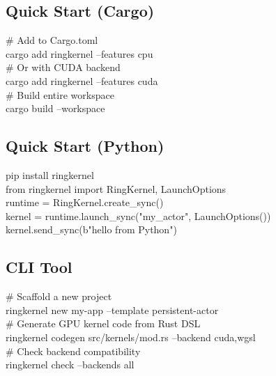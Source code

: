 \documentclass[11pt,a4paper]{article}
\begin{document}
\subsection{Quick Start (Cargo)}

\begin{tcolorbox}[colback=brand!3, colframe=brand!40, boxrule=0.5pt, arc=3pt,
                   left=8pt, right=8pt, top=6pt, bottom=6pt]
\ttfamily\small
\# Add to Cargo.toml\\
cargo add ringkernel --features cpu\\[6pt]
\# Or with CUDA backend\\
cargo add ringkernel --features cuda\\[6pt]
\# Build entire workspace\\
cargo build --workspace
\end{tcolorbox}

\subsection{Quick Start (Python)}

\begin{tcolorbox}[colback=brand!3, colframe=brand!40, boxrule=0.5pt, arc=3pt,
                   left=8pt, right=8pt, top=6pt, bottom=6pt]
\ttfamily\small
pip install ringkernel\\[6pt]
from ringkernel import RingKernel, LaunchOptions\\[2pt]
runtime = RingKernel.create\_sync()\\
kernel = runtime.launch\_sync("my\_actor", LaunchOptions())\\
kernel.send\_sync(b"hello from Python")
\end{tcolorbox}

\subsection{CLI Tool}

\begin{tcolorbox}[colback=brand!3, colframe=brand!40, boxrule=0.5pt, arc=3pt,
                   left=8pt, right=8pt, top=6pt, bottom=6pt]
\ttfamily\small
\# Scaffold a new project\\
ringkernel new my-app --template persistent-actor\\[6pt]
\# Generate GPU kernel code from Rust DSL\\
ringkernel codegen src/kernels/mod.rs --backend cuda,wgsl\\[6pt]
\# Check backend compatibility\\
ringkernel check --backends all
\end{tcolorbox}
\end{document}

